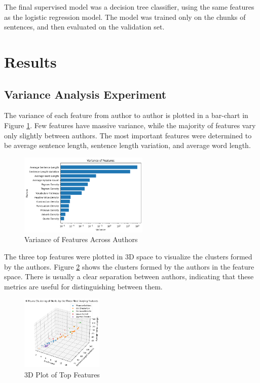 \documentclass[journal]{IEEEtran} %
\begin{document}
The final supervised model was a decision tree classifier, using the same features as the logistic regression model. The model was trained only on the chunks of sentences, and then evaluated on the validation set.

\section{Results}

\subsection{Variance Analysis Experiment}

The variance of each feature from author to author is plotted in a bar-chart in Figure \ref{vary1}. Few features have massive variance, while the majority of features vary only slightly between authors. The most important features were determined to be average sentence length, sentence length variation, and average word length.

\begin{figure}
    \caption{Variance of Features Across Authors}
    \begin{center}
    \centerline{\includegraphics[width=0.55\textwidth]{./vary1.png}}
    \end{center}
    \centering
    \label{vary1}
\end{figure}

The three top features were plotted in 3D space to visualize the clusters formed by the authors. Figure \ref{vary2} shows the clusters formed by the authors in the feature space. There is usually a clear separation between authors, indicating that these metrics are useful for distinguishing between them.

\begin{figure}[h!]
    \caption{3D Plot of Top Features}
    \begin{center}
    \centerline{\includegraphics[width=0.35\textwidth]{./vary2.png}}
    \end{center}
    \centering
    \label{vary2}
\end{figure}
\end{document}
